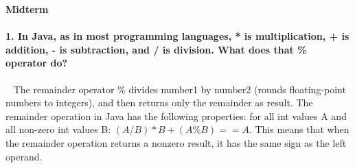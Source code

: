 \documentclass[12pt, leqno]{article}
\begin{document}
\pagestyle{fancy}
\begin{center}
	{\large {\bf Midterm}} \\
\end{center}

\paragraph*{1. In Java, as in most programming languages, * is multiplication, + is addition, - is subtraction, and / is division. What does that \% operator do?}~{} 
\newline\indent The remainder operator \% divides number1 by number2 (rounds floating-point numbers to integers), and then returns only the remainder as result. The remainder operation in Java has the following properties: for all int values A and all non-zero int values B: $ (A / B) * B + (A \% B) == A$. This means that when the remainder operation returns a nonzero result, it has the same sign as the left operand.
\end{document}
